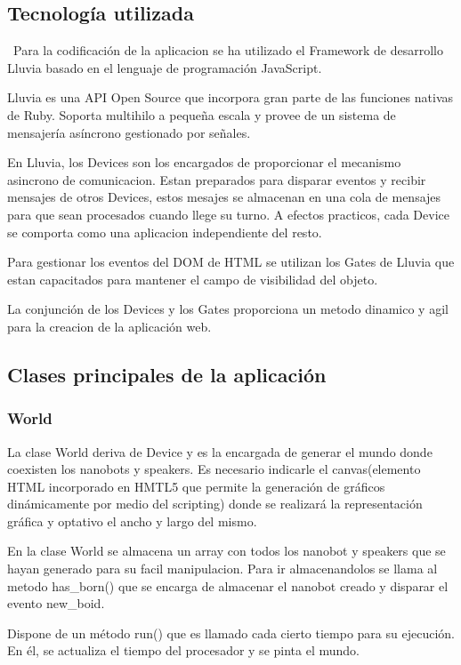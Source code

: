 \subsection{Tecnología utilizada}
\label{sec:tecnologia_utilizada}
\
Para la codificación de la aplicacion se ha utilizado el Framework de desarrollo Lluvia basado en el lenguaje de programación JavaScript. 

Lluvia es una API Open Source que incorpora gran parte de las funciones nativas de Ruby. Soporta multihilo a pequeña escala y provee de un sistema de mensajería asíncrono gestionado por señales. 

En Lluvia, los Devices son los encargados de proporcionar el mecanismo asincrono de comunicacion. Estan preparados para disparar eventos y recibir mensajes de otros Devices, estos mesajes se almacenan en una cola de mensajes para que sean procesados cuando llege su turno. A efectos practicos, cada Device se comporta como una aplicacion independiente del resto.

Para gestionar los eventos del DOM de HTML se utilizan los Gates de Lluvia que estan capacitados para mantener el campo de visibilidad del objeto. 

La conjunción de los Devices y los Gates proporciona un metodo dinamico y agil para la creacion de la aplicación web. 
\subsection{Clases principales de la aplicación}
\label{sec:clases_principlaes}

\subsubsection{World}
\label{sec:world}
La clase World deriva de Device y es la encargada de generar el mundo donde coexisten los nanobots y speakers. Es necesario indicarle el canvas(elemento HTML incorporado en HMTL5 que permite la generación de gráficos dinámicamente por medio del scripting) donde se realizará la representación gráfica y optativo el ancho y largo del mismo. 

En la clase World se almacena un array con todos los nanobot y speakers que se hayan generado  para su facil manipulacion. Para ir almacenandolos se llama al metodo has\_born() que se encarga de almacenar el nanobot creado y disparar el evento new\_boid.

Dispone de un método run() que es llamado cada cierto tiempo para su ejecución. En él,  se actualiza el tiempo del procesador y se pinta el mundo.

